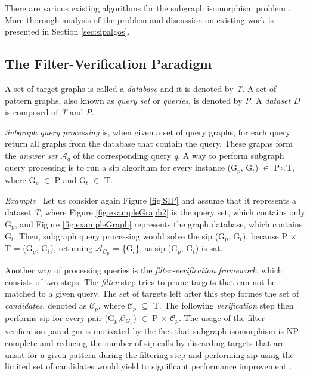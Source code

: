 \documentclass{l4proj}
\newcounter{example}[section]
\newenvironment{example}[1][]{\refstepcounter{example}\par\medskip
   \noindent \textit{Example~\theexample #1} \rmfamily}{\medskip}
\newcommand{\fancyA}{\mathcal{A}}
\newcommand{\fancyC}{\mathcal{C}}
\begin{document}
There are various existing algorithms for the subgraph isomorphism problem \cite{vf2,Solnon:2010,CP2015,Larrosa:2002,Bonnici:2013,Zampelli:2010,nauty}. More thorough analysis of the problem and discussion on existing work is presented in Section \ref{sec:sipalgos}.

\subsection{The Filter-Verification Paradigm}
A set of target graphs is called a \emph{database} and it is denoted by \emph{T}. A set of pattern graphs, also known as \emph{query set} or \emph{queries}, is denoted by \emph{P}. A \emph{dataset D} is composed of \emph{T} and \emph{P}. 

\textit{Subgraph query processing} is, when given a set of query graphs, for each query return all graphs from the database that contain the query. These graphs form the \emph{answer set} $\fancyA_{q}$ of the corresponding query \emph{q}. A way to perform subgraph query processing is to run a \gls{sip} algorithm for every instance (G$_{p}$, G$_{t}$) $\in$ P$\times$T, where G$_{p}$ $\in$ P and G$_{t}$ $\in$ T.

\begin{example}
\label{ex:pathIndexing}
Let us consider again Figure \ref{fig:SIP} and assume that it represents a dataset \emph{T}, where Figure \ref{fig:exampleGraph2} is the query set, which contains only G$_{p}$, and Figure \ref{fig:exampleGraph} represents the graph database, which contains G$_{t}$. Then, subgraph query processing would solve the \gls{sip} (G$_{p}$, G$_{t}$), because P $\times$ T = (G$_{p}$, G$_{t}$), returning $\fancyA_{G_{p}}$ = \{G$_{t}$\}, as \gls{sip} (G$_{p}$, G$_{t}$) is \gls{sat}.
\end{example}

Another way of processing queries is the \emph{filter-verification framework}, which consists of two steps. The \emph{filter} step tries to prune targets that can not be matched to a given query. The set of targets left after this step formes the set of \emph{candidates}, denoted as $\fancyC_{p}$, where $\fancyC_{p}$ $\subseteq$ T. The following \textit{verification} step then performs \gls{sip} for every pair (G$_{p}$,$\fancyC_{G_{p}}$) $\in$ P $\times$ $\fancyC_p$. The usage of the filter-verification paradigm is motivated by the fact that subgraph isomorphism is NP-complete and reducing the number of \gls{sip} calls by discarding targets that are \gls{unsat} for a given pattern during the filtering step and performing \gls{sip} using the limited set of candidates would yield to significant performance improvement \cite{ctindex,foteini}.
\end{document}
